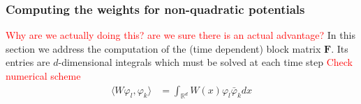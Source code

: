 \subsubsection{Computing the weights for non-quadratic potentials}
\textcolor{red}{Why are we actually doing this? are we sure there is an 
actual advantage?}
In this section we address the computation of the (time dependent) block matrix $\bm{F}$.
Its entries are $d$-dimensional integrals which must be solved at 
each time step \textcolor{red}{Check numerical scheme}
\begin{equation}
  \begin{split}
    \langle 
      W \varphi_l , \varphi_k 
    \rangle
    &= 
    \int_{\mathbb{R}^d}
    W(x) \varphi_l \bar{\varphi}_k dx 
  \end{split}
\end{equation}
